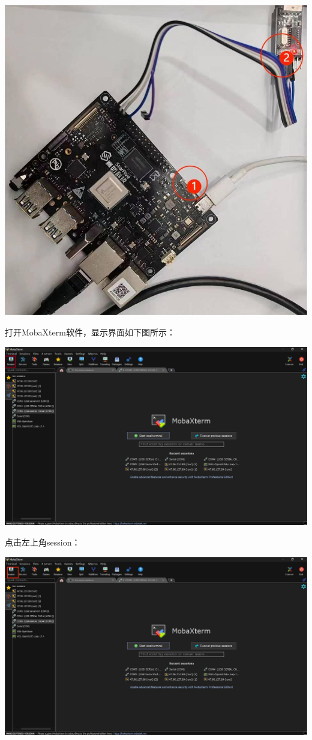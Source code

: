 {\begin{enumerate}
	\centering
	\includegraphics[width=0.9\linewidth]{figures/08-02-星光二号线路.jpg}
	\raggedright
	
	
	打开MobaXterm软件，显示界面如下图所示：

	\centering
	\includegraphics[width=0.9\linewidth]{figures/08-02-MobaXterm界面.jpg}
	
	
	\raggedright
	
	点击左上角session：
	
	\centering
	\includegraphics[width=0.9\linewidth]{figures/08-02-session.jpg}
	

\end{enumerate}}
